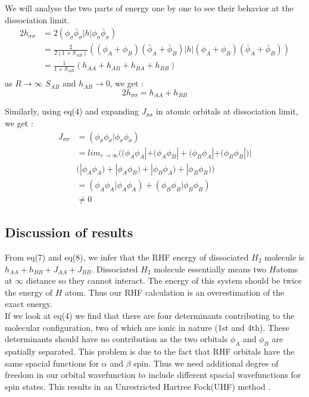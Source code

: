 \documentclass[11pt]{article}   	%
\begin{document}
	We will analyse the two parts of energy one by one to see their behavior at the dissociation limit. \\
	\begin{equation}
	\begin{split}
		2 h_{\sigma \sigma}&=2 (\phi_{\sigma}\bar{\phi}_{\sigma}|h|
		\phi_{\sigma}\bar{\phi}_{\sigma})\\
		&=\frac{2}{2(1+S_{AB})}((\phi_A+\phi_B)(\bar{\phi}_A+\bar{\phi}_B)|h|(\phi_A+\phi_B)(\bar{\phi}_A+\bar{\phi}_B))\\
		&=\frac{1}{1+S_{AB}}(h_{AA}+h_{AB}+h_{BA}+h_{BB})\\
	\end{split}
	\end{equation}
	as $R\rightarrow \infty$ $S_{AB}$ and $h_{AB}\rightarrow 0$, we get :
	\begin{equation}
		2h_{\sigma \sigma}=h_{AA}+h_{BB}
	\end{equation}
	
	Similarly, using eq(4) and expanding $J_{\sigma \sigma}$ in atomic orbitals at dissociation limit, we get :
	\begin{equation}
	\begin{split}
		J_{\sigma \sigma} &=(\phi_{\sigma} \phi_{\sigma}|\phi_{\sigma} \phi_{\sigma})\\
			&= lim_{r\rightarrow\infty}\big( (\phi_A\phi_A|+(\phi_A\phi_B|+(\phi_B\phi_A|
			+(\phi_B\phi_B|\big)\big|\\&    \big(|\phi_A\phi_A)+|\phi_A\phi_B)+|\phi_B\phi_A)+
			|\phi_B\phi_B)\big)\\
			&=(\phi_A\phi_A|\phi_A\phi_A)+(\phi_B\phi_B|\phi_B\phi_B)\\
			&\neq 0
	\end{split}
	\end{equation}
	\subsection{Discussion of results}
	From eq(7) and eq(8), we infer that the RHF energy of dissociated $H_2$ molecule is $h_{AA}+h_{BB}+
	J_{AA}+J_{BB}$. Dissociated $H_2$ molecule essentially means two $ H $atoms at $\infty$ distance so 
	they cannot interact. The energy of this system should be twice the energy of $H$ atom. 
	Thus our RHF calculation is an overestimation of the exact energy.  \\
	
	If we look at eq(4) we find that there are four determinants contributing to the molecular configuration, two of which are ionic in nature (1st and 4th). 
	These determinants should have no contribution as the two orbitals $\phi_A$ and $\phi_B$ are spatially separated.
	This problem is due to the fact that RHF orbitals have the same spacial functions for $\alpha$ and $\beta$ spin. 
	Thus we need additional degree of freedom in our 
	orbital wavefunction to include different spacial wavefunctions for spin states. This results in an Unrestricted 
	Hartree Fock(UHF) method . \\
\end{document}
